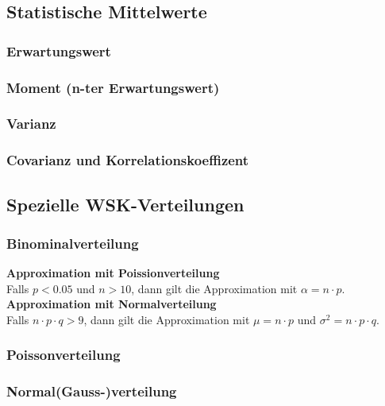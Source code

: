 \subsection{Statistische Mittelwerte }
\subsubsection{Erwartungswert }
\subsubsection{Moment (n-ter Erwartungswert) }
\subsubsection{Varianz}
\subsubsection{Covarianz und Korrelationskoeffizent }
\vspace{0.25cm}

\subsection{Spezielle WSK-Verteilungen }
\subsubsection{Binominalverteilung}\label{binominalverteilung}
\textbf{Approximation mit Poissionverteilung} \\
Falls $p < 0.05$ und $n > 10$, dann gilt die Approximation mit $\alpha = n \cdot p$. \\

\textbf{Approximation mit Normalverteilung} \\
Falls $n \cdot p \cdot q > 9$, dann gilt die Approximation mit $\mu = n \cdot p$ und
$\sigma^2 = n \cdot p \cdot q$.

\subsubsection{Poissonverteilung }
\subsubsection{Normal(Gauss-)verteilung }